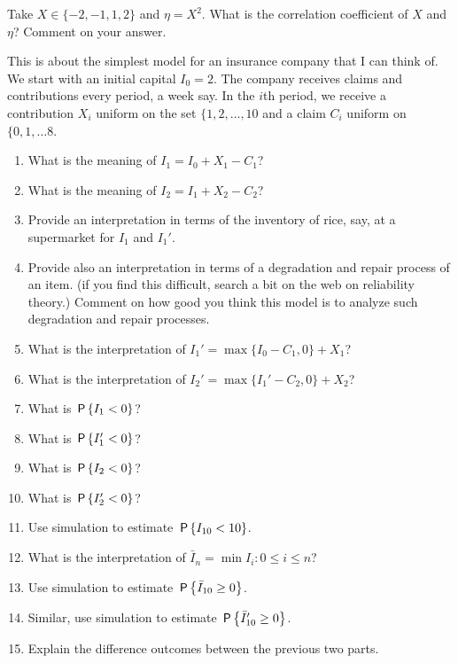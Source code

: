 \documentclass[a4paper]{article}
\begin{document}
\begin{exercise}
Take $X\in\{-2, -1, 1, 2\}$ and $\eta = X^2$. What is the correlation coefficient of $X$ and $\eta$? Comment on your answer. 
\end{exercise}

\begin{exercise}
This is about the simplest model for an insurance company that I can think of.
We start with an initial capital $I_0=2$.
The company receives claims and contributions every period, a week say.
In the $i$th period, we receive a contribution $X_{i}$ uniform on the set $\{1, 2,\ldots,10$ and a claim $C_i$ uniform on $\{0, 1, \ldots 8$.
\begin{enumerate}
\item What is the meaning of $I_1=I_0+X_1-C_1$?
\item What is the meaning of $I_2=I_1+X_2-C_2$?
\item Provide an interpretation in terms of the inventory of rice, say, at a supermarket for $I_{1}$ and $I_{1}'$.
\item Provide also an interpretation in terms of a degradation and repair process of an item.
  (if you find this difficult, search a bit on the web on reliability theory.)
  Comment on how good you think this model is to analyze such degradation and repair processes.
\item What is the interpretation of $I_1'=\max\{I_0-C_1,0\} + X_1$?
\item What is the interpretation of $I_2'=\max\{I_1'-C_2,0\} + X_2$?
\item What is  $\P{I_1 < 0}$?
\item What is  $\P{I_1' < 0}$?
\item What is  $\P{I_2 < 0}$?
\item What is  $\P{I_2' < 0}$?
\item Use simulation to estimate $\P{I_{10}<10}$.
\item What is the interpretation of $\bar I_{n} = \min{I_{i} : 0\leq i\leq n}$? 
\item  Use simulation to estimate $\P{\bar I_{10} \geq 0}$.
\item Similar,   use simulation to estimate $\P{\bar I_{10}' \geq 0}$.
\item Explain the difference outcomes between the previous two parts. 
\end{enumerate}
\end{exercise}
\end{document}
